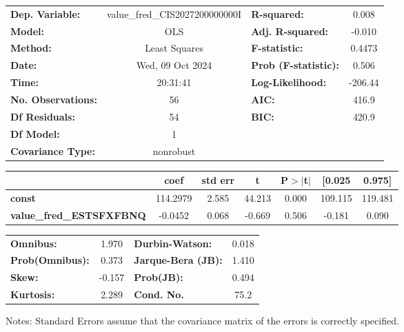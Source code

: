\begin{center}
\begin{tabular}{lclc}
\toprule
\textbf{Dep. Variable:}          & value\_fred\_CIS2027200000000I & \textbf{  R-squared:         } &     0.008   \\
\textbf{Model:}                  &              OLS               & \textbf{  Adj. R-squared:    } &    -0.010   \\
\textbf{Method:}                 &         Least Squares          & \textbf{  F-statistic:       } &    0.4473   \\
\textbf{Date:}                   &        Wed, 09 Oct 2024        & \textbf{  Prob (F-statistic):} &    0.506    \\
\textbf{Time:}                   &            20:31:41            & \textbf{  Log-Likelihood:    } &   -206.44   \\
\textbf{No. Observations:}       &                 56             & \textbf{  AIC:               } &     416.9   \\
\textbf{Df Residuals:}           &                 54             & \textbf{  BIC:               } &     420.9   \\
\textbf{Df Model:}               &                  1             & \textbf{                     } &             \\
\textbf{Covariance Type:}        &           nonrobust            & \textbf{                     } &             \\
\bottomrule
\end{tabular}
\begin{tabular}{lcccccc}
                                 & \textbf{coef} & \textbf{std err} & \textbf{t} & \textbf{P$> |$t$|$} & \textbf{[0.025} & \textbf{0.975]}  \\
\midrule
\textbf{const}                   &     114.2979  &        2.585     &    44.213  &         0.000        &      109.115    &      119.481     \\
\textbf{value\_fred\_ESTSFXFBNQ} &      -0.0452  &        0.068     &    -0.669  &         0.506        &       -0.181    &        0.090     \\
\bottomrule
\end{tabular}
\begin{tabular}{lclc}
\textbf{Omnibus:}       &  1.970 & \textbf{  Durbin-Watson:     } &    0.018  \\
\textbf{Prob(Omnibus):} &  0.373 & \textbf{  Jarque-Bera (JB):  } &    1.410  \\
\textbf{Skew:}          & -0.157 & \textbf{  Prob(JB):          } &    0.494  \\
\textbf{Kurtosis:}      &  2.289 & \textbf{  Cond. No.          } &     75.2  \\
\bottomrule
\end{tabular}
\end{center}

Notes: \newline
 [1] Standard Errors assume that the covariance matrix of the errors is correctly specified.